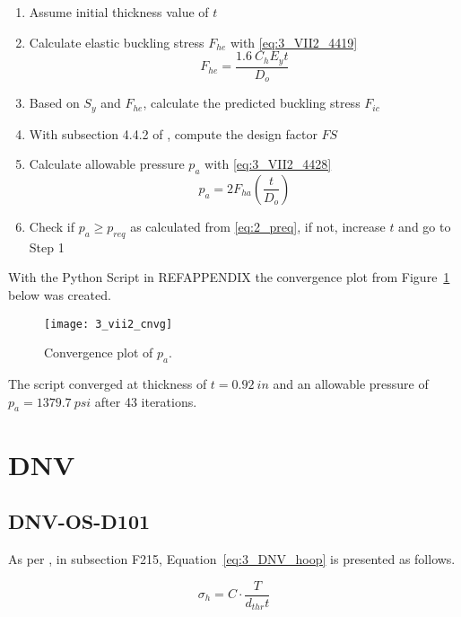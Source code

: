 \begin{enumerate}
	\item Assume initial thickness value of $t$
	\item Calculate elastic buckling stress $F_{he}$ with \ref{eq:3_VII2_4419}
		\begin{equation}
			\label{eq:3_VII2_4419}
			F_{he} = \frac{1.6\ C_h E_y t}{D_o}
		\end{equation}
	\item Based on $S_y$ and $F_{he}$, calculate the predicted buckling stress $F_{ic}$
	\item With subsection 4.4.2 of \citep{ASMEbvpcVII2}, compute the design factor $FS$
	\item Calculate allowable pressure $p_a$ with \ref{eq:3_VII2_4428}
		\begin{equation}
			\label{eq:3_VII2_4428}
			p_a = 2 F_{ha} \left(\frac{t}{D_o}\right)
		\end{equation}
	\item Check if $p_a \geq p_{req}$ as calculated from \ref{eq:2_preq}, if not, increase $t$ and go to Step 1
	
\end{enumerate}

With the Python Script in REFAPPENDIX the convergence plot from Figure~\ref{fig:3_vii2_cnvg} below was created.
\begin{figure}[!htbp]
    \centering
    \texttt{[image: 3\_vii2\_cnvg]}
    \caption{Convergence plot of $p_a$.}
    \label{fig:3_vii2_cnvg}
\end{figure}

The script converged at thickness of $t = 0.92\ in$ and an allowable pressure of $p_a = 1379.7\ psi$ after 43 iterations. 

\section{DNV}

\subsection{DNV-OS-D101}

As per \citep{DNVOSD101}, in subsection F215, Equation~\ref{eq:3_DNV_hoop} is presented as follows.

\begin{equation}
	\label{eq:3_DNV_hoop}
	\sigma_h = C\cdot\frac{T}{d_{thr}t}
\end{equation}

